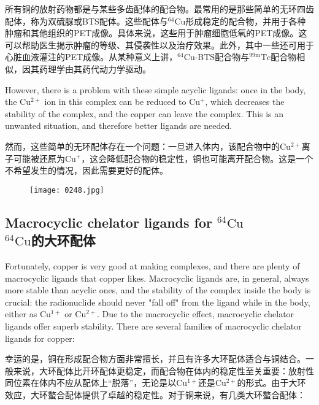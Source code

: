 \documentclass[dvipsnames, svgnames,a4paper,11pt]{article}
\begin{document}
所有铜的放射药物都是与某些多齿配体的配合物。最常用的是那些简单的无环四齿配体，称为双硫脲或BTS配体。这些配体与\(\mathrm{^{64}Cu}\)形成稳定的配合物，并用于各种肿瘤和其他组织的PET成像。具体来说，这些用于肿瘤细胞低氧的PET成像。这可以帮助医生揭示肿瘤的等级、其侵袭性以及治疗效果。此外，其中一些还可用于心脏血液灌注的PET成像。从某种意义上讲，\(\mathrm{^{64}Cu}\)-BTS配合物与\(\mathrm{^{99m}Tc}\)配合物相似，因其药理学由其药代动力学驱动。

However, there is a problem with these simple acyclic ligands: once in the body, the \(\mathrm{Cu^{2+}}\) ion in this complex can be reduced to \(\mathrm{Cu^+}\), which decreases the stability of the complex, and the copper can leave the complex. This is an unwanted situation, and therefore better ligands are needed.

然而，这些简单的无环配体存在一个问题：一旦进入体内，该配合物中的\(\mathrm{Cu^{2+}}\)离子可能被还原为\(\mathrm{Cu^+}\)，这会降低配合物的稳定性，铜也可能离开配合物。这是一个不希望发生的情况，因此需要更好的配体。

\begin{figure}[h]
	\centering
    \texttt{[image: 0248.jpg]}  
     \label{fig331}
\end{figure}

\subsection{Macrocyclic chelator ligands for \(\mathrm{^{64}Cu}\)\\ \(\mathrm{^{64}Cu}\)的大环配体}  

Fortunately, copper is very good at making complexes, and there are plenty of macrocyclic ligands that copper likes. Macrocyclic ligands are, in general, always more stable than acyclic ones, and the stability of the complex inside the body is crucial: the radionuclide should never "fall off" from the ligand while in the body, either as \(\mathrm{Cu^{1+}}\) or \(\mathrm{Cu^{2+}}\). Due to the macrocyclic effect, macrocyclic chelator ligands offer superb stability. There are several families of macrocyclic chelator ligands for copper:

幸运的是，铜在形成配合物方面非常擅长，并且有许多大环配体适合与铜结合。一般来说，大环配体比开环配体更稳定，而配合物在体内的稳定性至关重要：放射性同位素在体内不应从配体上“脱落”，无论是以\(\mathrm{Cu^{1+}}\)还是\(\mathrm{Cu^{2+}}\)的形式。由于大环效应，大环螯合配体提供了卓越的稳定性。对于铜来说，有几类大环螯合配体：
\end{document}
